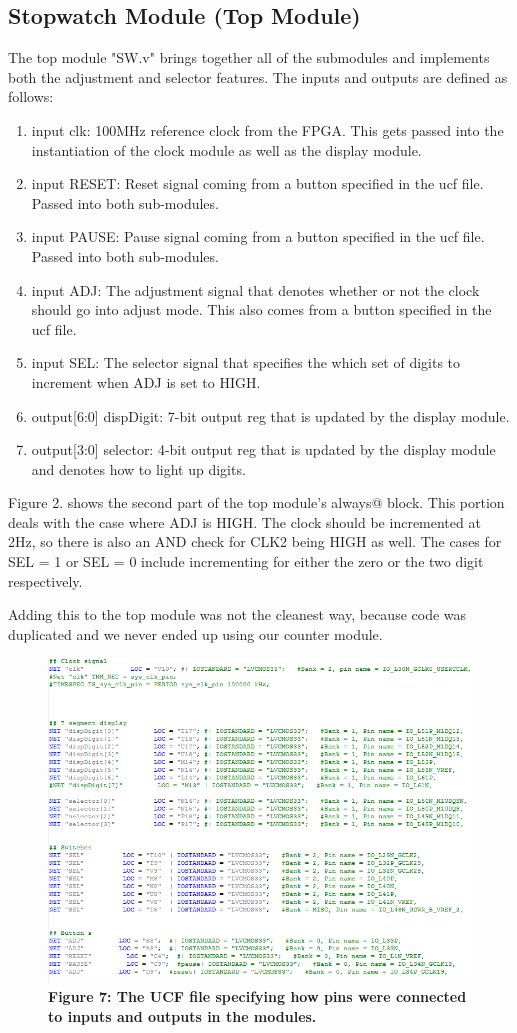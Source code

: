 \documentclass[journal]{IEEEtran}
\begin{document}
\subsection{Stopwatch Module (Top Module)}
The top module "SW.v" brings together all of the submodules and implements both the adjustment and selector features. The inputs and outputs are defined as follows:
\begin{enumerate}
	\item input clk: 100MHz reference clock from the FPGA. This gets passed into the instantiation of the clock module as well as the display module.
	\item input RESET: Reset signal coming from a button specified in the ucf file. Passed into both sub-modules.
	\item input PAUSE: Pause signal coming from a button specified in the ucf file. Passed into both sub-modules.
	\item input ADJ: The adjustment signal that denotes whether or not the clock should go into adjust mode. This also comes from a button specified in the ucf file.
	\item input SEL: The selector signal that specifies the which set of digits to increment when ADJ is set to HIGH. 
	\item output[6:0] dispDigit: 7-bit output reg that is updated by the display module.
	\item output[3:0] selector: 4-bit output reg that is updated by the display module and denotes how to light up digits.
\end{enumerate}
Figure 2. shows the second part of the top module's always@ block. This portion deals with the case where ADJ is HIGH. The clock should be incremented at 2Hz, so there is also an AND check for CLK2 being HIGH as well. The cases for SEL = 1 or SEL = 0 include incrementing for either the zero or the two digit respectively.  
\par
Adding this to the top module was not the cleanest way, because code was duplicated and we never ended up using our counter module. 
\begin{figure}[H]
	\centering\includegraphics[scale=0.5]{ucf}
	\caption{\textbf{Figure 7: The UCF file specifying how pins were connected to inputs and outputs in the modules.}}
\end{figure}
\end{document}
